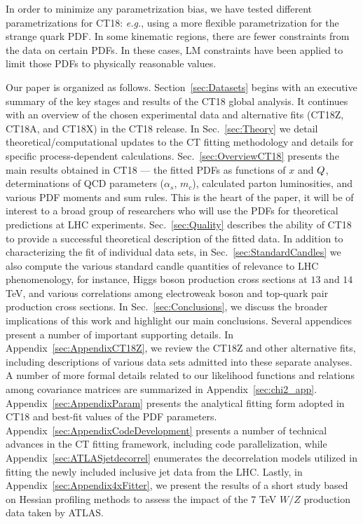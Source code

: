 In order to minimize any parametrization bias, we have tested different parametrizations for CT18: {\it e.g.}, using a more flexible parametrization for the strange quark PDF.
In some kinematic regions, there are fewer constraints from the data on certain PDFs. In these cases, LM constraints have been applied to limit those PDFs to
physically reasonable values. 

Our paper is organized as follows.
%
Section~\ref{sec:Datasets} begins with an executive summary of the key stages and results of the CT18 global analysis. It continues with an overview of the chosen experimental data
and alternative fits (CT18Z, CT18A, and CT18X) in the CT18 release.
%
%
In Sec.~\ref{sec:Theory} we detail theoretical/computational updates to the CT
fitting methodology and details for specific process-dependent calculations.
%
%
Sec.~\ref{sec:OverviewCT18} presents the main results obtained in CT18 ---
the fitted PDFs as functions of $x$ and $Q$, determinations of QCD parameters ($\alpha_s$, $m_c$),
calculated parton luminosities, and various PDF moments and sum rules. This is the heart of the paper,
it will be of interest to a broad group of researchers who will use the PDFs for theoretical predictions at LHC experiments.
%
%
Sec.~\ref{sec:Quality} describes the ability of CT18 to provide a successful theoretical
description of the fitted data.
%
%
%
In addition to characterizing the fit of individual data sets, in Sec.~\ref{sec:StandardCandles}
we also compute the various standard candle quantities of relevance to LHC phenomenology, for
instance, Higgs boson production cross sections at $13$ and $14$ TeV, and various correlations among
electroweak boson and top-quark pair production cross sections.
%
In Sec.~\ref{sec:Conclusions}, we discuss the broader implications of this work and highlight
our main conclusions.
%
%
Several appendices present a number of important supporting details.
%
In Appendix~\ref{sec:AppendixCT18Z}, we review the CT18Z and other alternative fits,
including descriptions of various data sets admitted into these separate analyses.
%
A number of more formal details related to our likelihood functions and relations
among covariance matrices are summarized in Appendix~\ref{sec:chi2_app}.
%
Appendix~\ref{sec:AppendixParam} presents the analytical fitting form adopted in CT18
and best-fit values of the PDF parameters.
%
Appendix~\ref{sec:AppendixCodeDevelopment} presents a number of technical advances
in the CT fitting framework, including code parallelization, while Appendix~\ref{sec:ATLASjetdecorrel}
enumerates the decorrelation models utilized in fitting the newly included inclusive
jet data from the LHC.
%
%
Lastly, in Appendix~\ref{sec:Appendix4xFitter}, we present the results of a short study based on Hessian profiling
methods to assess the impact of the 7 TeV $W/Z$ production data taken by ATLAS.
